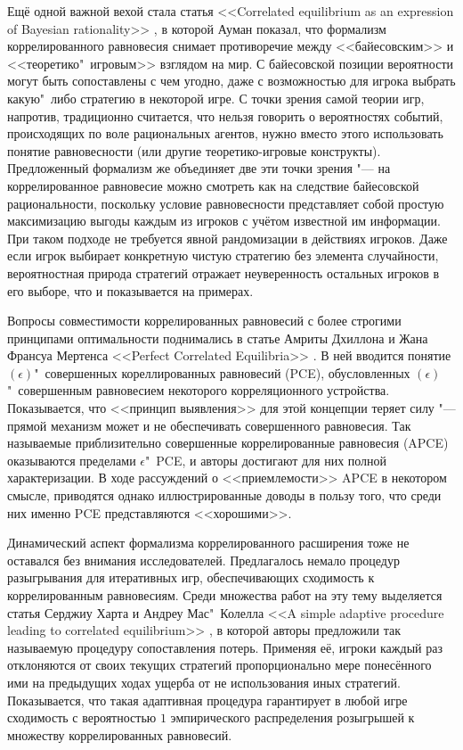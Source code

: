 Ещё одной важной вехой стала статья <<Correlated equilibrium as an expression of Bayesian rationality>> \cite{Aumann87}, в которой Ауман показал, что формализм коррелированного равновесия снимает противоречие между <<байесовским>> и <<теоретико"~игровым>> взглядом на мир. С байесовской позиции вероятности могут быть сопоставлены с чем угодно, даже с возможностью для игрока выбрать какую"~либо стратегию в некоторой игре. С точки зрения самой теории игр, напротив, традиционно считается, что нельзя говорить о вероятностях событий, происходящих по воле рациональных агентов, нужно вместо этого использовать понятие равновесности (или другие теоретико-игровые конструкты). Предложенный формализм же объединяет две эти точки зрения "--- на коррелированное равновесие можно смотреть как на следствие байесовской рациональности, поскольку условие равновесности представляет собой простую максимизацию выгоды каждым из игроков с учётом известной им информации. При таком подходе не требуется явной рандомизации в действиях игроков. Даже если игрок выбирает конкретную чистую стратегию без элемента случайности, вероятностная природа стратегий отражает неуверенность остальных игроков в его выборе, что и показывается на примерах.

Вопросы совместимости коррелированных равновесий с более строгими принципами оптимальности поднимались в статье Амриты Дхиллона и Жана Франсуа Мертенса <<Perfect Correlated Equilibria>> \cite{Dhillon}. В ней вводится понятие $(\epsilon)$"~совершенных кореллированных равновесий (PCE), обусловленных $(\epsilon)$"~совершенным равновесием некоторого корреляционного устройства. Показывается, что <<принцип выявления>> для этой концепции теряет силу "--- прямой механизм может и не обеспечивать совершенного равновесия. Так называемые приблизительно совершенные коррелированные равновесия (APCE) оказываются пределами $\epsilon$"~PCE, и авторы достигают для них полной характеризации. В ходе рассуждений о <<приемлемости>> APCE в некотором смысле, приводятся однако иллюстрированные доводы в пользу того, что среди них именно PCE представляются <<хорошими>>.

Динамический аспект формализма коррелированного расширения тоже не оставался без внимания исследователей. Предлагалось немало процедур разыгрывания для итеративных игр, обеспечивающих сходимость к коррелированным равновесиям. Среди множества работ на эту тему выделяется статья Серджиу Харта и Андреу Мас"~Колелла <<A simple adaptive procedure leading to correlated equilibrium>> \cite{Hart}, в которой авторы предложили так называемую процедуру сопоставления потерь. Применяя её, игроки каждый раз отклоняются от своих текущих стратегий пропорционально мере понесённого ими на предыдущих ходах ущерба от не использования иных стратегий. Показывается, что такая адаптивная процедура гарантирует в любой игре сходимость с вероятностью $1$ эмпирического распределения розыгрышей к множеству коррелированных равновесий.

